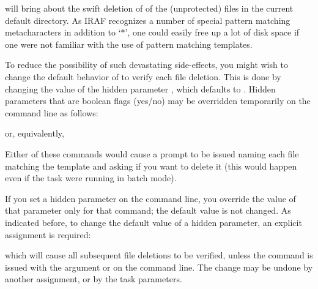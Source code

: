 \begin{quotation}\noindent
{} 
\end{quotation}

\noindent
will bring about the swift deletion of  of the (unprotected)
files in the current default directory.
As IRAF recognizes a number of special pattern matching metacharacters in
addition to `$*$', one could easily free up a lot of disk space if one were
not familiar with the use of pattern matching templates.

To reduce the possibility of such devastating side-effects, you might wish to
change the default behavior of  to verify each file deletion.
This is done by changing the value of the hidden parameter ,
which defaults to .  Hidden parameters that are boolean flags 
(yes/no) may be overridden temporarily on the command line as follows:

\begin{quotation}\noindent
{} 
\end{quotation}

\noindent
or, equivalently,

\begin{quotation}\noindent
{} 
\end{quotation}

\noindent
Either of these commands would cause a prompt to be issued naming
each file matching the template and asking if you want to delete
it (this would happen even if the task were running in batch mode).

If you set a hidden parameter on the command line, you override the value
of that parameter only for that command; the default value is not changed.
As indicated before, to change the default value of a hidden parameter,
an explicit assignment is required:

\begin{quotation}\noindent
{} 
\end{quotation}

\noindent
which will cause all subsequent file deletions to be verified, unless the
 command is issued with the argument 
or  on the command line.  The change may be undone by
another assignment, or by  the task parameters.  

